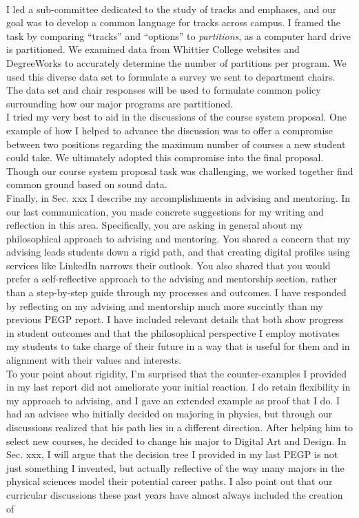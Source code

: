 \documentclass[../../main.tex]{subfiles}
\begin{document}
\\
\vspace{0.25cm}
I led a sub-committee dedicated to the study of tracks and emphases, and our goal was to develop a common language for tracks across campus.  I framed the task by comparing ``tracks'' and ``options'' to \textit{partitions}, as a computer hard drive is partitioned.  We examined data from Whittier College websites and DegreeWorks to accurately determine the number of partitions per program.  We used this diverse data set to formulate a survey we sent to department chairs.  The data set and chair responses will be used to formulate common policy surrounding how our major programs are partitioned.
\\
\vspace{0.25cm}
I tried my very best to aid in the discussions of the course system proposal.  One example of how I helped to advance the discussion was to offer a compromise between two positions regarding the maximum number of courses a new student could take.  We ultimately adopted this compromise into the final proposal.  Though our course system proposal task was challenging, we worked together find common ground based on sound data.
\\
\vspace{0.25cm}
Finally, in Sec. xxx I describe my accomplishments in advising and mentoring.  In our last communication, you made concrete suggestions for my writing and reflection in this area.  Specifically, you are asking in general about my philosophical approach to advising and mentoring.  You shared a concern that my advising leads students down a rigid path, and that creating digital profiles using services like LinkedIn narrows their outlook.  You also shared that you would prefer a self-reflective approach to the advising and mentorship section, rather than a step-by-step guide through my processes and outcomes.  I have responded by reflecting on my advising and mentorship much more succintly than my previous PEGP report.  I have included relevant details that both show progress in student outcomes and that the philosophical perspective I employ motivates my students to take charge of their future in a way that is useful for them and in alignment with their values and interests.
\\
\vspace{0.25cm}
To your point about rigidity, I'm surprised that the counter-examples I provided in my last report did not ameliorate your initial reaction.  I do retain flexibility in my approach to advising, and I gave an extended example as proof that I do.  I had an advisee who initially decided on majoring in physics, but through our discussions realized that his path lies in a different direction.  After helping him to select new courses, he decided to change his major to Digital Art and Design.  In Sec. xxx, I will argue that the decision tree I provided in my last PEGP is not just something I invented, but actually reflective of the way many majors in the physical sciences model their potential career paths.  I also point out that our curricular discussions these past years have almost always included the creation of 
\end{document}
